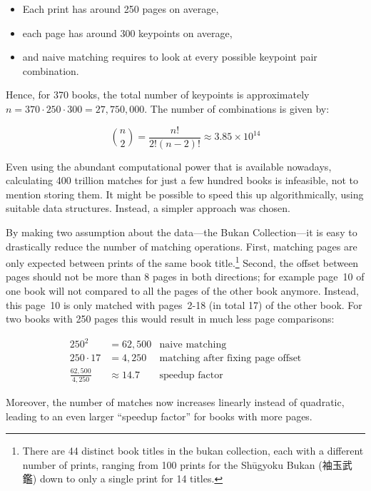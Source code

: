 \documentclass{ltjarticle}
\begin{document}
\begin{itemize}
    \setlength\itemsep{0em}
    \item Each print has around 250 pages on average,
    \item each page has around 300 keypoints on average,
    \item and naive matching requires to look at every possible keypoint pair combination.
\end{itemize}

Hence, for 370 books, the total number of keypoints is approximately $n = 370 \cdot 250 \cdot 300 = 27,750,000$. The number of combinations is given by:

\begin{equation*}
    \binom{n}{2} = \frac{n!}{2!(n-2)!} \approx 3.85 \times 10^{14}
\end{equation*}

Even using the abundant computational power that is available nowadays, calculating 400 trillion matches for just a few hundred books is infeasible, not to mention storing them. It might be possible to speed this up algorithmically, using suitable data structures. Instead, a simpler approach was chosen.

By making two assumption about the data---the Bukan Collection---it is easy to drastically reduce the number of matching operations. First, matching pages are only expected between prints of the same book title.\footnote{There are 44 distinct book titles in the bukan collection, each with a different number of prints, ranging from 100 prints for the Shūgyoku Bukan (袖玉武鑑) down to only a single print for 14 titles.} Second, the offset between pages should not be more than 8 pages in both directions; for example page~10 of one book will not compared to all the pages of the other book anymore. Instead, this page~10 is only matched with pages~2-18 (in total 17) of the other book. For two books with 250 pages this would result in much less page comparisons:

\begin{align*}
    250^2 &= 62,500 & \text{naive matching} \\
    250 \cdot 17 &= 4,250 & \text{matching after fixing page offset} \\
    \frac{62,500}{4,250} &\approx 14.7 & \text{speedup factor}
\end{align*}

Moreover, the number of matches now increases linearly instead of quadratic, leading to an even larger “speedup factor” for books with more pages.
\end{document}
